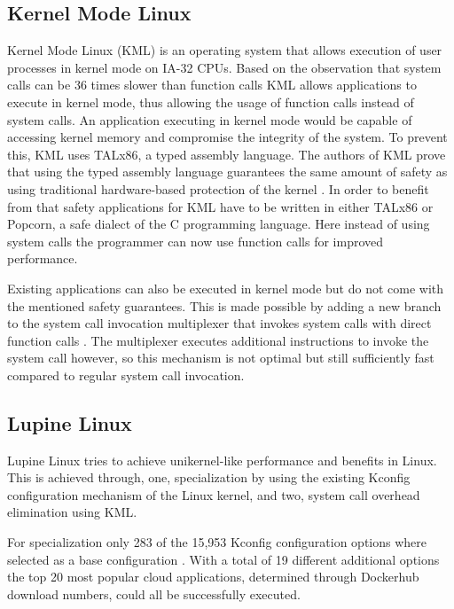 \documentclass[10pt,twocolumn,a4paper]{article}
\begin{document}
  \subsection{Kernel Mode Linux}
    Kernel Mode Linux (KML) is an operating system that allows
    execution of user processes in kernel mode on IA-32 CPUs.
    Based on the observation that system calls can be 36 times slower
    than function calls \cite{maeda2003} KML allows applications to execute in
    kernel mode, thus allowing the usage of function calls instead of system calls.
    An application executing in kernel mode would be capable of accessing kernel
    memory and compromise the integrity of the system.
    To prevent this, KML uses TALx86, a typed assembly language.
    The authors of KML prove that using the typed assembly language guarantees the 
    same amount of safety as using traditional hardware-based protection of the kernel \cite{maeda2003}.
    In order to benefit from that safety applications for KML have to be written in
    either TALx86 or Popcorn, a safe dialect of the C programming language.
    Here instead of using system calls the programmer can now use function calls for improved performance.

    Existing applications can also be executed in kernel mode but do not come with
    the mentioned safety guarantees.
    This is made possible by adding a new branch to the system call invocation multiplexer
    that invokes system calls with direct function calls \cite{maeda2003}.
    The multiplexer executes additional instructions to invoke the system call however, 
    so this mechanism is not optimal but still sufficiently fast compared to regular system call
    invocation.

  \subsection{Lupine Linux}
    Lupine Linux tries to achieve unikernel-like performance and benefits in Linux.
    This is achieved through, one, specialization by using the existing Kconfig 
    configuration mechanism of the Linux kernel, 
    and two, system call overhead elimination using KML.

    For specialization only 283 of the 15,953 Kconfig configuration options where
    selected as a base configuration \cite{kuo20}.
    With a total of 19 different additional options the top 20 most popular cloud applications,
    determined through Dockerhub download numbers, could all be successfully executed.
\end{document}
